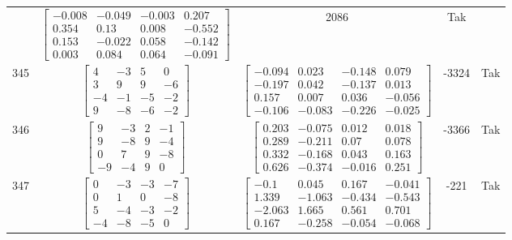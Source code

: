 \documentclass[a4paper,12pt]{article}
\begin{document}
\begin{tabular}{c c c c c}
&
$\begin{bmatrix} -0.008 & -0.049 & -0.003 & 0.207 \\ 0.354 & 0.13 & 0.008 & -0.552 \\ 0.153 & -0.022 & 0.058 & -0.142 \\ 0.003 & 0.084 & 0.064 & -0.091 \end{bmatrix}$
&
2086
&
Tak
\\
345
&
$\begin{bmatrix} 4 & -3 & 5 & 0 \\ 3 & 9 & 9 & -6 \\ -4 & -1 & -5 & -2 \\ 9 & -8 & -6 & -2 \end{bmatrix}$
&
$\begin{bmatrix} -0.094 & 0.023 & -0.148 & 0.079 \\ -0.197 & 0.042 & -0.137 & 0.013 \\ 0.157 & 0.007 & 0.036 & -0.056 \\ -0.106 & -0.083 & -0.226 & -0.025 \end{bmatrix}$
&
-3324
&
Tak
\\
346
&
$\begin{bmatrix} 9 & -3 & 2 & -1 \\ 9 & -8 & 9 & -4 \\ 0 & 7 & 9 & -8 \\ -9 & -4 & 9 & 0 \end{bmatrix}$
&
$\begin{bmatrix} 0.203 & -0.075 & 0.012 & 0.018 \\ 0.289 & -0.211 & 0.07 & 0.078 \\ 0.332 & -0.168 & 0.043 & 0.163 \\ 0.626 & -0.374 & -0.016 & 0.251 \end{bmatrix}$
&
-3366
&
Tak
\\
347
&
$\begin{bmatrix} 0 & -3 & -3 & -7 \\ 0 & 1 & 0 & -8 \\ 5 & -4 & -3 & -2 \\ -4 & -8 & -5 & 0 \end{bmatrix}$
&
$\begin{bmatrix} -0.1 & 0.045 & 0.167 & -0.041 \\ 1.339 & -1.063 & -0.434 & -0.543 \\ -2.063 & 1.665 & 0.561 & 0.701 \\ 0.167 & -0.258 & -0.054 & -0.068 \end{bmatrix}$
&
-221
&
Tak
\\

\end{tabular}
\end{document}
